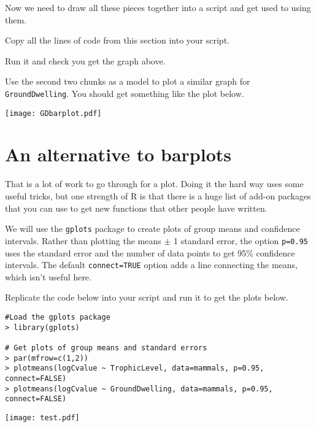 Now we need to draw all these pieces together into a script and get 
used to using them.
\begin{compactitem}[$\quad\star$]
	\item Copy all the lines of code from this section into your script.
	\item Run it and check you get the graph above.
	\item Use the second two chunks as a model to plot a similar graph 
	for {\tt GroundDwelling}. You should get something like the plot 
	below.
\end{compactitem}

\begin{center}
	\texttt{[image: GDbarplot.pdf]}	
\end{center}
 
\section{An alternative to barplots}

That is a lot of work to go through for a plot. Doing it the hard way 
uses some useful tricks, but one strength of R is that there is a huge 
list of add-on packages that you can use to get new functions that 
other people have written.

We will use the {\tt gplots} package to create  plots of group means 
and confidence intervals. Rather than plotting the means $\pm$ 1 
standard error, the option {\tt p=0.95} uses the standard error and the 
number of data points to get 95\% confidence intervals. The default 
{\tt connect=TRUE} option adds a line connecting the means, which isn't 
useful here. 

\begin{compactitem}[$\quad\star$]
	\item Replicate the code below into your script and run it to get the 
	plots below.
\end{compactitem}

\begin{lstlisting}
#Load the gplots package
> library(gplots)

# Get plots of group means and standard errors
> par(mfrow=c(1,2))
> plotmeans(logCvalue ~ TrophicLevel, data=mammals, p=0.95, connect=FALSE)
> plotmeans(logCvalue ~ GroundDwelling, data=mammals, p=0.95, connect=FALSE)
\end{lstlisting}


\begin{center}
	\texttt{[image: test.pdf]}	
\end{center}

